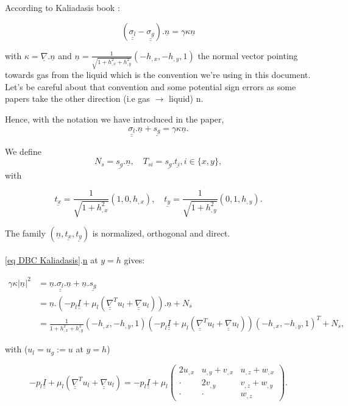 \documentclass[12pt]{article}
\begin{document}
According to Kaliadasis book \cite{Kalliadasis2011FallingLF}: 

\begin{equation}\label{eq DBC Kaliadasis}(\underline{\underline{\sigma_l}}-\underline{\underline{\sigma_g}}).\underline{n}=\gamma\kappa\underline{n}
\end{equation}

with $\kappa = \underline{\nabla}.\underline{n}$ and $\underline{n}=\frac{1}{\sqrt{1+h_{,x}^2+h_{,y}^2}}(-h_{,x}, -h_{,y}, 1)$ the normal vector pointing towards gas from the liquid which is the convention we're using in this document. Let's be careful about that convention and some potential sign errors as some papers take the other direction (i.e gas $\rightarrow$ liquid) n.

Hence, with the notation we have introduced in the paper, $$\underline{\underline{\sigma_l}}.\underline{n}+\underline{s_g}=\gamma\kappa\underline{n}.$$

We define $$N_s = \underline{s_g}.\underline{n}, \quad T_{si}=\underline{s_g}.\underline{t_i}, i\in\{x, y\},$$ with 

$$\underline{t_x}=\frac{1}{\sqrt{1+h_{,x}^2}}(1, 0, h_{,x}),\quad \underline{t_y}=\frac{1}{\sqrt{1+h_{,y}^2}}(0, 1, h_{,y}).$$ 

The family $(\underline{n}, \underline{t_x}, \underline{t_y})$ is normalized, orthogonal and direct.
\newline
\\
\\
\eqref{eq DBC Kaliadasis}.\underline{n} at $y=h$ gives:


\begin{align*}
\gamma \kappa |\underline{n}|^2&= \underline{n}.\underline{\underline{\sigma_l}}.\underline{n} + \underline{n}.\underline{s_g} \\
 &= \underline{n}.\left( -p_l \underline{\underline{I}} + \mu_l(\underline{\underline{\nabla}}^Tu_l+\underline{\underline{\nabla}}u_l)\right).\underline{n}+N_s \\
 &= \frac{1}{1+h_{,x}^2+h_{,y}^2}(-h_{,x}, -h_{,y}, 1)\left( -p_l \underline{\underline{I}} + \mu_l(\underline{\underline{\nabla}}^Tu_l+\underline{\underline{\nabla}}u_l)\right)(-h_{,x}, -h_{,y}, 1)^T + N_s,
\end{align*}

with ($u_l=u_g :=u$ at $y=h$)

\begin{equation*}
 -p_l \underline{\underline{I}} + \mu_l(\underline{\underline{\nabla}}^Tu_l+\underline{\underline{\nabla}}u_l)= -p_l\underline{\underline{I}} + \mu_l\begin{pmatrix}
2u_{,x} & u_{,y}+v_{,x} & u_{,z}+w_{,x} \\
\cdot & 2v_{,y} & v_{,z}+w_{,y} \\
\cdot & \cdot & w_{,z}
\end{pmatrix} .
\end{equation*}
\end{document}
